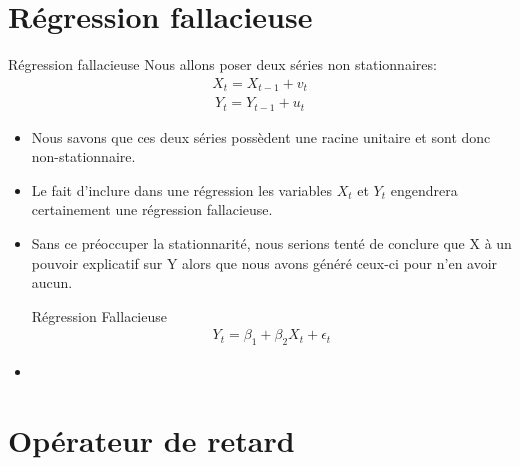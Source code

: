 \documentclass{beamer}
\begin{document}
\section{Régression fallacieuse}
\frame{\tableofcontents[current]}


\begin{frame}{Régression fallacieuse}
Nous allons poser deux séries non stationnaires:
\begin{align*}
X_t=X_{t-1}+v_t
\end{align*}
\begin{align*}
Y_t=Y_{t-1}+u_t
\end{align*}
\begin{itemize}
\item Nous savons que ces deux séries possèdent une racine unitaire et sont donc non-stationnaire. 
\item Le fait d’inclure dans une régression les variables $X_t$ et $Y_t$ engendrera certainement une régression fallacieuse.
\item Sans ce préoccuper la stationnarité, nous serions tenté de conclure que X à un pouvoir explicatif sur Y alors que nous avons généré ceux-ci pour n’en avoir aucun.
\begin{block}{Régression Fallacieuse}
\begin{align*}
Y_t = \beta_1 +\beta_2 X_t + \epsilon_t
\end{align*}
\end{block}
\item

\end{itemize}
\end{frame}

\section{Opérateur de retard}
\frame{\tableofcontents[current]}
\end{document}
